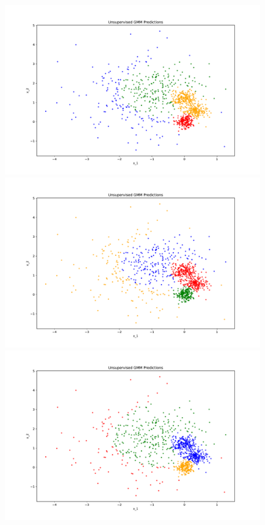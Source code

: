 \begin{answer}
\begin{figure}[!h]
  \includegraphics[width=\linewidth]{semi_supervised_em/pred_0.pdf}
\endminipage\hfill
{}
  \includegraphics[width=\linewidth]{semi_supervised_em/pred_1.pdf}
\endminipage\hfill
{}%
  \includegraphics[width=\linewidth]{semi_supervised_em/pred_2.pdf}

\end{figure}
\end{answer}
